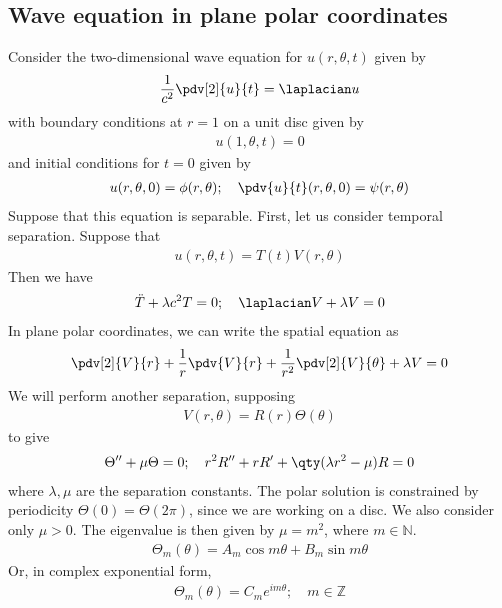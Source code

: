 \subsection{Wave equation in plane polar coordinates}
Consider the two-dimensional wave equation for $u(r,\theta,t)$ given by
\begin{align*}
	\frac{1}{c^2} \pdv[2]{u}{t} = \laplacian u
\end{align*}
with boundary conditions at $r = 1$ on a unit disc given by
\begin{align*}
	u(1,\theta,t) = 0
\end{align*}
and initial conditions for $t = 0$ given by
\begin{align*}
	u(r,\theta,0) = \phi(r,\theta);\quad \pdv{u}{t}(r,\theta,0) = \psi(r,\theta)
\end{align*}
Suppose that this equation is separable.
First, let us consider temporal separation.
Suppose that
\begin{align*}
	u(r,\theta,t) = T(t) V(r,\theta)
\end{align*}
Then we have
\begin{align*}
	\ddot T + \lambda c^2 T = 0;\quad \laplacian V + \lambda V = 0
\end{align*}
In plane polar coordinates, we can write the spatial equation as
\begin{align*}
	\pdv[2]{V}{r} + \frac{1}{r} \pdv{V}{r} + \frac{1}{r^2}\pdv[2]{V}{\theta} + \lambda V = 0
\end{align*}
We will perform another separation, supposing
\begin{align*}
	V(r,\theta) = R(r) \Theta(\theta)
\end{align*}
to give
\begin{align*}
	\Theta'' + \mu \Theta = 0;\quad r^2 R'' + r R' + \qty(\lambda r^2 - \mu) R = 0
\end{align*}
where $\lambda, \mu$ are the separation constants.
The polar solution is constrained by periodicity $\Theta(0) = \Theta(2 \pi)$, since we are working on a disc.
We also consider only $\mu > 0$.
The eigenvalue is then given by $\mu = m^2$, where $m \in \mathbb N$.
\begin{align*}
	\Theta_m(\theta) = A_m \cos m \theta + B_m \sin m \theta
\end{align*}
Or, in complex exponential form,
\begin{align*}
	\Theta_m(\theta) = C_m e^{im\theta};\quad m \in \mathbb Z
\end{align*}

